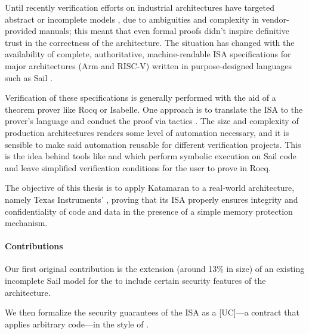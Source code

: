 Until recently verification efforts on industrial architectures have targeted abstract or incomplete models \cite{Georges2021}\cite{Jensen2013}\cite{Guanciale2016}, due to ambiguities and complexity in vendor-provided manuals; this meant that even formal proofs didn't inspire definitive trust in the correctness of the architecture. The situation has changed with the availability of complete, authoritative, machine-readable ISA specifications \cite{Armstrong2019} for major architectures (Arm and RISC-V) written in purpose-designed languages such as Sail \cite{Armstrong}.

Verification of these specifications is generally performed with the aid of a theorem prover like Rocq or Isabelle. One approach is to translate the ISA to the prover's language and conduct the proof via tactics \cite{Armstrong2019}\cite{Bauereiss2022}. The size and complexity of production architectures renders some level of automation necessary, and it is sensible to make said automation reusable for different verification projects. This is the idea behind tools like  \cite{Sammler2022} and  \cite{Huyghebaert2023} which perform symbolic execution on Sail code and leave simplified verification conditions for the user to prove in Rocq.



The objective of this thesis is to apply Katamaran to a real-world architecture, namely Texas Instruments' \msp, proving that its ISA properly ensures integrity and confidentiality of code and data in the presence of a simple memory protection mechanism.

\paragraph{Contributions}

Our first original contribution is the extension (around 13\% in size) of an existing incomplete Sail model for the \msp \cite{mspthesis} to include certain security features of the architecture.

We then formalize the security guarantees of the ISA as a [UC]---a contract that applies arbitrary code---in the style of \cite{Huyghebaert2023}.

